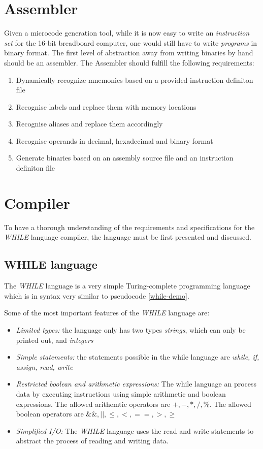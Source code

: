 \section{Assembler}
Given a microcode generation tool, while it is now easy to write an \emph{instruction set} for the
16-bit breadboard computer, one would still have to write \emph{programs} in binary format. The
first level of abstraction away from writing binaries by hand should be an assembler.
The Assembler should fulfill the following requirements:
\begin{enumerate}
  \item  Dynamically recognize mnemonics based on a provided instruction definiton file
  \item  Recognise labels and replace them with memory locations
  \item  Recognise aliases and replace them accordingly
  \item  Recognise operands in decimal, hexadecimal and binary format
  \item Generate binaries based on an assembly source file and an instruction definiton file
\end{enumerate}

\section{Compiler}
To have a thorough understanding of the requirements and specifications for the \emph{WHILE}
language compiler, the language must be first presented and discussed.

\subsection{WHILE language}
The \emph{WHILE} language is a very simple Turing-complete programming language which is in syntax
very similar to pseudocode \ref{while-demo}.

 \label{while-demo}

Some of the most important features of the \emph{WHILE} language are:
\begin{itemize}
  \item \emph{Limited types: } the language only has two types \emph{strings}, which can only be
  printed out, and \emph{integers}
  \item \emph{Simple statements: } the statements possible in the while language are \emph{while,
  if, assign, read, write}
  \item \emph{Restricted boolean and arithmetic expressions: } The while language an process data
  by executing instructions using simple arithmetic and boolean expressions. The allowed arithemtic
  operators are \emph{$+, -, *, /, \%$}. The allowed boolean operators are \emph{$\&\&, ||,  \leq, <, ==,
  >,  \geq$}
  \item \emph{Simplified I/O: } The \emph{WHILE} language uses the read and write statements to
  abstract the process of reading and writing data.
\end{itemize}

